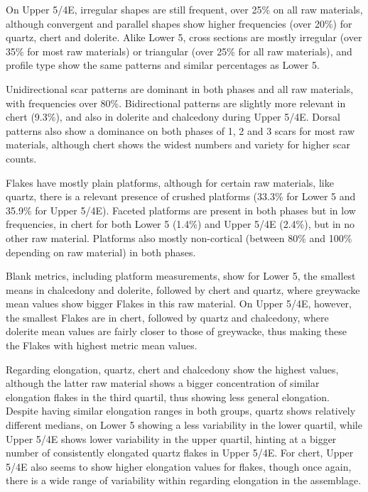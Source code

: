 \documentclass[12pt,twoside]{reedthesis}
\begin{document}
On Upper 5/4E, irregular shapes are still frequent, over 25\% on all raw materials, although convergent and parallel shapes show higher frequencies (over 20\%) for quartz, chert and dolerite. Alike Lower 5, cross sections are mostly irregular (over 35\% for most raw materials) or triangular (over 25\% for all raw materials), and profile type show the same patterns and similar percentages as Lower 5.

Unidirectional scar patterns are dominant in both phases and all raw materials, with frequencies over 80\%. Bidirectional patterns are slightly more relevant in chert (9.3\%), and also in dolerite and chalcedony during Upper 5/4E. Dorsal patterns also show a dominance on both phases of 1, 2 and 3 scars for most raw materials, although chert shows the widest numbers and variety for higher scar counts.

Flakes have mostly plain platforms, although for certain raw materials, like quartz, there is a relevant presence of crushed platforms (33.3\% for Lower 5 and 35.9\% for Upper 5/4E). Faceted platforms are present in both phases but in low frequencies, in chert for both Lower 5 (1.4\%) and Upper 5/4E (2.4\%), but in no other raw material. Platforms also mostly non-cortical (between 80\% and 100\% depending on raw material) in both phases.

Blank metrics, including platform measurements, show for Lower 5, the smallest means in chalcedony and dolerite, followed by chert and quartz, where greywacke mean values show bigger Flakes in this raw material. On Upper 5/4E, however, the smallest Flakes are in chert, followed by quartz and chalcedony, where dolerite mean values are fairly closer to those of greywacke, thus making these the Flakes with highest metric mean values.

Regarding elongation, quartz, chert and chalcedony show the highest values, although the latter raw material shows a bigger concentration of similar elongation flakes in the third quartil, thus showing less general elongation. Despite having similar elongation ranges in both groups, quartz shows relatively different medians, on Lower 5 showing a less variability in the lower quartil, while Upper 5/4E shows lower variability in the upper quartil, hinting at a bigger number of consistently elongated quartz flakes in Upper 5/4E. For chert, Upper 5/4E also seems to show higher elongation values for flakes, though once again, there is a wide range of variability within regarding elongation in the assemblage.
\end{document}
